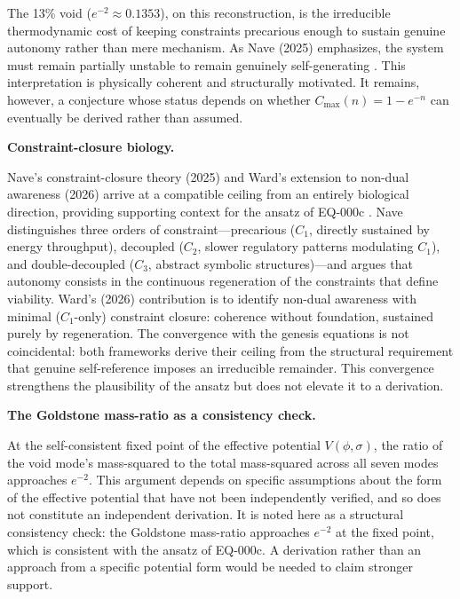 \documentclass[12pt,a4paper]{article}
\begin{document}
The 13\% void ($e^{-2} \approx 0.1353$), on this reconstruction, is the irreducible thermodynamic cost of keeping constraints precarious enough to sustain genuine autonomy rather than mere mechanism. As Nave (2025) emphasizes, the system must remain partially unstable to remain genuinely self-generating \citep{Nave2025}. This interpretation is physically coherent and structurally motivated. It remains, however, a conjecture whose status depends on whether $C_{\max}(n) = 1 - e^{-n}$ can eventually be derived rather than assumed.

\textbf{Constraint-closure biology.}

Nave's constraint-closure theory (2025) and Ward's extension to non-dual awareness (2026) arrive at a compatible ceiling from an entirely biological direction, providing supporting context for the ansatz of EQ-000c \citep{Nave2025,Ward2026}. Nave distinguishes three orders of constraint---precarious ($C_1$, directly sustained by energy throughput), decoupled ($C_2$, slower regulatory patterns modulating $C_1$), and double-decoupled ($C_3$, abstract symbolic structures)---and argues that autonomy consists in the continuous regeneration of the constraints that define viability. Ward's (2026) contribution is to identify non-dual awareness with minimal ($C_1$-only) constraint closure: coherence without foundation, sustained purely by regeneration. The convergence with the genesis equations is not coincidental: both frameworks derive their ceiling from the structural requirement that genuine self-reference imposes an irreducible remainder. This convergence strengthens the plausibility of the ansatz but does not elevate it to a derivation.

\textbf{The Goldstone mass-ratio as a consistency check.}

At the self-consistent fixed point of the effective potential $V(\phi, \sigma)$, the ratio of the void mode's mass-squared to the total mass-squared across all seven modes approaches $e^{-2}$. This argument depends on specific assumptions about the form of the effective potential that have not been independently verified, and so does not constitute an independent derivation. It is noted here as a structural consistency check: the Goldstone mass-ratio approaches $e^{-2}$ at the fixed point, which is consistent with the ansatz of EQ-000c. A derivation rather than an approach from a specific potential form would be needed to claim stronger support.

\end{document}
